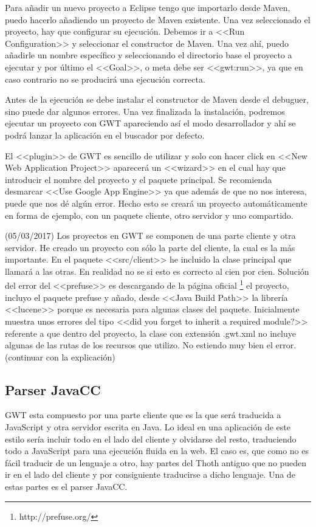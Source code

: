 Para añadir un nuevo proyecto a Eclipse tengo que importarlo desde Maven, puedo hacerlo añadiendo un proyecto de Maven existente. Una vez seleccionado el proyecto, hay que configurar su ejecución. Debemos ir a <<Run Configuration>> y seleccionar el constructor de Maven. Una vez ahí, puedo añadirle un nombre específico y seleccionando el directorio base el proyecto a ejecutar y por último el <<Goal>>, o meta debe ser <<gwt:run>>, ya que en caso contrario no se producirá una ejecución correcta.

Antes de la ejecución se debe instalar el constructor de Maven desde el debuguer, sino puede dar algunos errores. Una vez finalizada la instalación, podremos ejecutar un proyecto con GWT apareciendo así el modo desarrollador y ahí se podrá lanzar la aplicación en el buscador por defecto.

El <<plugin>> de GWT es sencillo de utilizar y solo con hacer click en <<New Web Application Project>> aparecerá un <<wizard>> en el cual hay que introducir el nombre del proyecto y el paquete principal. Se recomienda desmarcar <<Use Google App Engine>> ya que además de que no nos interesa, puede que nos dé algún error. Hecho esto se creará un proyecto automáticamente en forma de ejemplo, con un paquete cliente, otro servidor y uno compartido.


(05/03/2017)
Los proyectos en GWT se componen de una parte cliente y otra servidor. He creado un proyecto con sólo la parte del cliente, la cual es la más importante. En el paquete <<src/client>> he incluido la clase principal que llamará a las otras. En realidad no se si esto es correcto al cien por cien.
Solución del error del  <<prefuse>> es descargando de la página oficial \footnote{http://prefuse.org/} el proyecto, incluyo el paquete prefuse y añado, desde <<Java Build Path>> la librería  <<lucene>> porque es necesaria para algunas clases del paquete. Inicialmente muestra unos errores del tipo <<did you forget to inherit a required module?>> referente a que dentro del proyecto, la clase con extensión .gwt.xml no incluye algunas de las rutas de los recursos que utilizo. No estiendo muy bien el error. (continuar con la explicación)


 
\subsection{Parser JavaCC}
GWT esta compuesto por una parte cliente que es la que será traducida a JavaScript y otra servidor escrita en Java. Lo ideal en una aplicación de este estilo sería incluir todo en el lado del cliente y olvidarse del resto, traduciendo todo a JavaScript para una ejecución fluida en la web. El caso es, que como no es fácil traducir de un lenguaje a otro, hay partes del Thoth antiguo que no pueden ir en el lado del cliente y por consiguiente traducirse a dicho lenguaje. Una de estas partes es el parser JavaCC.


